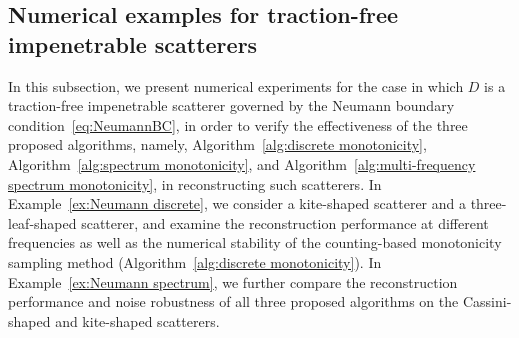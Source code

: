 \documentclass[11pt,reqno,twoside]{amsart}
\theoremstyle{definition}
\theoremstyle{remark}
\numberwithin{equation}{section}
\begin{document}
\subsection{Numerical examples for traction-free impenetrable scatterers}

In this subsection, we present numerical experiments for the case in which $D$ is a traction-free impenetrable scatterer governed by the Neumann boundary condition~\eqref{eq:NeumannBC}, in order to verify the effectiveness of the three proposed algorithms, namely, Algorithm~\ref{alg:discrete monotonicity}, Algorithm~\ref{alg:spectrum monotonicity}, and Algorithm~\ref{alg:multi-frequency spectrum monotonicity}, in reconstructing such scatterers.
In Example~\ref{ex:Neumann discrete}, we consider a kite-shaped scatterer and a three-leaf-shaped scatterer, and examine the reconstruction performance at different frequencies as well as the numerical stability of the counting-based monotonicity sampling method (Algorithm~\ref{alg:discrete monotonicity}). %
In Example~\ref{ex:Neumann spectrum}, we further compare the reconstruction performance and noise robustness of all three proposed algorithms on the Cassini-shaped and kite-shaped scatterers.
\end{document}
